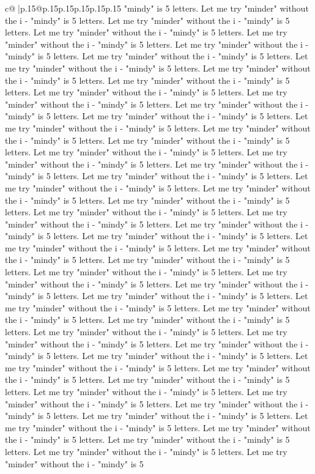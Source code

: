 \documentclass{article}
\begin{document}
{\begin{supertabular}{c@{$\;$}|p{.15\linewidth}@{}p{.15\linewidth}p{.15\linewidth}p{.15\linewidth}p{.15\linewidth}p{.15\linewidth}}
{{{"mindy" is 5 letters. Let me try "minder" without the i {-} "mindy" is 5 letters. Let me try "minder" without the i {-} "mindy" is 5 letters. Let me try "minder" without the i {-} "mindy" is 5 letters. Let me try "minder" without the i {-} "mindy" is 5 letters. Let me try "minder" without the i {-} "mindy" is 5 letters. Let me try "minder" without the i {-} "mindy" is 5 letters. Let me try "minder" without the i {-} "mindy" is 5 letters. Let me try "minder" without the i {-} "mindy" is 5 letters. Let me try "minder" without the i {-} "mindy" is 5 letters. Let me try "minder" without the i {-} "mindy" is 5 letters. Let me try "minder" without the i {-} "mindy" is 5 letters. Let me try "minder" without the i {-} "mindy" is 5 letters. Let me try "minder" without the i {-} "mindy" is 5 letters. Let me try "minder" without the i {-} "mindy" is 5 letters. Let me try "minder" without the i {-} "mindy" is 5 letters. Let me try "minder" without the i {-} "mindy" is 5 letters. Let me try "minder" without the i {-} "mindy" is 5 letters. Let me try "minder" without the i {-} "mindy" is 5 letters. Let me try "minder" without the i {-} "mindy" is 5 letters. Let me try "minder" without the i {-} "mindy" is 5 letters. Let me try "minder" without the i {-} "mindy" is 5 letters. Let me try "minder" without the i {-} "mindy" is 5 letters. Let me try "minder" without the i {-} "mindy" is 5 letters. Let me try "minder" without the i {-} "mindy" is 5 letters. Let me try "minder" without the i {-} "mindy" is 5 letters. Let me try "minder" without the i {-} "mindy" is 5 letters. Let me try "minder" without the i {-} "mindy" is 5 letters. Let me try "minder" without the i {-} "mindy" is 5 letters. Let me try "minder" without the i {-} "mindy" is 5 letters. Let me try "minder" without the i {-} "mindy" is 5 letters. Let me try "minder" without the i {-} "mindy" is 5 letters. Let me try "minder" without the i {-} "mindy" is 5 letters. Let me try "minder" without the i {-} "mindy" is 5 letters. Let me try "minder" without the i {-} "mindy" is 5 letters. Let me try "minder" without the i {-} "mindy" is 5 letters. Let me try "minder" without the i {-} "mindy" is 5 letters. Let me try "minder" without the i {-} "mindy" is 5 letters. Let me try "minder" without the i {-} "mindy" is 5 letters. Let me try "minder" without the i {-} "mindy" is 5 letters. Let me try "minder" without the i {-} "mindy" is 5 letters. Let me try "minder" without the i {-} "mindy" is 5 letters. Let me try "minder" without the i {-} "mindy" is 5 letters. Let me try "minder" without the i {-} "mindy" is 5 letters. Let me try "minder" without the i {-} "mindy" is 5 letters. Let me try "minder" without the i {-} "mindy" is 5 letters. Let me try "minder" without the i {-} "mindy" is 5 letters. Let me try "minder" without the i {-} "mindy" is 5 letters. Let me try "minder" without the i {-} "mindy" is 5 letters. Let me try "minder" without the i {-} "mindy" is 5 letters. Let me try "minder" without the i {-} "mindy" is 5 letters. Let me try "minder" without the i {-} "mindy" is 5 letters. Let me try "minder" without the i {-} "mindy" is 5 letters. Let me try "minder" without the i {-} "mindy" is 5 }}}
\end{supertabular}}
\end{document}
